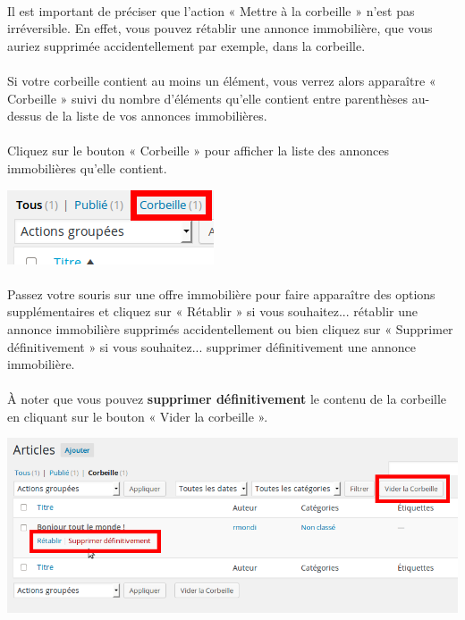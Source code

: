 \documentclass[10pt,a4paper]{article}
\begin{document}
\paragraph{}Il est important de préciser que l’action « Mettre à la corbeille » n’est pas irréversible. En effet, vous pouvez rétablir une annonce immobilière, que vous auriez supprimée accidentellement par exemple, dans la corbeille.
\paragraph{}Si votre corbeille contient au moins un élément, vous verrez alors apparaître « Corbeille » suivi du nombre d’éléments qu’elle contient entre parenthèses au-dessus de la liste de vos annonces immobilières.
\paragraph{}Cliquez sur le bouton « Corbeille » pour afficher la liste des annonces immobilières qu’elle contient.
\begin{center}
\includegraphics[scale=0.35]{img/0069.png}
\end{center}
\paragraph{}Passez votre souris sur une offre immobilière pour faire apparaître des options supplémentaires et cliquez sur « Rétablir » si vous souhaitez... rétablir une annonce immobilière supprimés accidentellement ou bien cliquez sur « Supprimer définitivement » si vous souhaitez... supprimer définitivement une annonce immobilière.
\paragraph{}À noter que vous pouvez \textbf{supprimer définitivement} le contenu de la corbeille en cliquant sur le bouton « Vider la corbeille ».
\begin{center}
\includegraphics[scale=0.35]{img/0070.png}
\end{center}
\newpage
\end{document}
